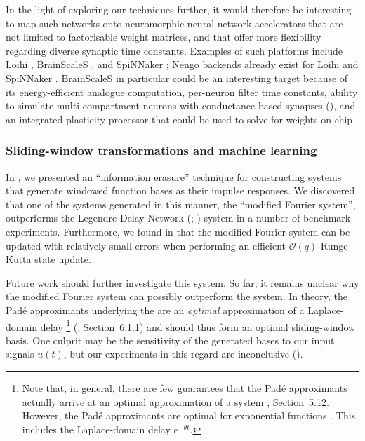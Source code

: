 In the light of exploring our techniques further, it would therefore be interesting to map such networks onto neuromorphic neural network accelerators that are not limited to factorisable weight matrices, and that offer more flexibility regarding diverse synaptic time constants.
Examples of such platforms include Loihi \citep{davies2018loihi}, BrainScaleS \citep{schemmel2010waferscale}, and SpiNNaker \citep{painkras2013spinnaker}; Nengo backends already exist for Loihi and SpiNNaker \citep{blouw2019benchmarking,mundy2015efficient}.
BrainScaleS in particular could be an interesting target because of its energy-efficient analogue computation, per-neuron filter time constants, ability to simulate multi-compartment \LIF neurons with conductance-based synapses (), and an integrated plasticity processor that could be used to solve for weights on-chip \citep{friedmann2017demonstrating}.

\subsubsection{Sliding-window transformations and machine learning}

In , we presented an \enquote{information erasure} technique for constructing \LTI systems that generate windowed function bases as their impulse responses.
We discovered that one of the systems generated in this manner, the \enquote{modified Fourier system}, outperforms the Legendre Delay Network (\LDN; \cite{voelker2018improving}) system in a number of benchmark experiments.
Furthermore, we found in  that the modified Fourier system can be updated with relatively small errors when performing an efficient $\mathcal{O}(q)$ Runge-Kutta state update.

Future work should further investigate this system.
So far, it remains unclear why the modified Fourier system can possibly outperform the \LDN system.
In theory, the Padé approximants underlying the \LDN are an \emph{optimal} approximation of a Laplace-domain delay%
\footnote{Note that, in general, there are few guarantees that the Padé approximants actually arrive at an optimal approximation of a system \citep{press2007numerical}, Section~5.12. However, the Padé approximants are optimal for exponential functions \citep{borwein1983pade}.
This includes the Laplace-domain delay $e^{-\theta t}$.}
(\cite{voelker2019}, Section~6.1.1) and should thus form an optimal sliding-window basis.
One culprit may be the sensitivity of the generated bases to our input signals $u(t)$, but our experiments in this regard are inconclusive ().

